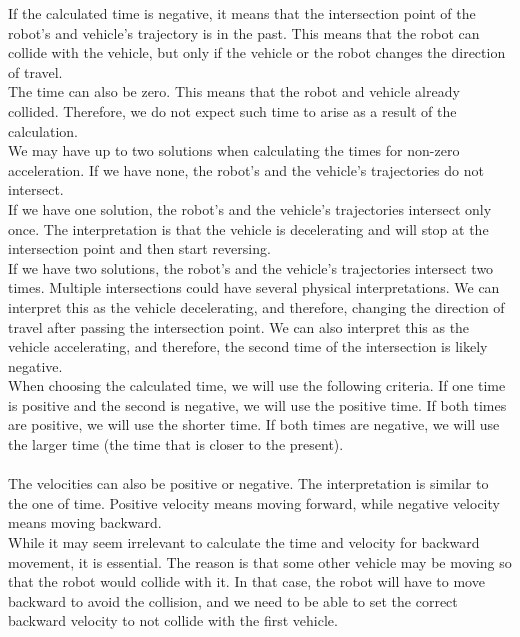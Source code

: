         If the calculated time is negative, it means that the intersection point of the robot's and vehicle's trajectory is in the past. This means that the robot can collide with the vehicle, but only if the vehicle or the robot changes the direction of travel.\\
        The time can also be zero. This means that the robot and vehicle already collided. Therefore, we do not expect such time to arise as a result of the calculation.\\
        We may have up to two solutions when calculating the times for non-zero acceleration. If we have none, the robot's and the vehicle's trajectories do not intersect.\\
        If we have one solution, the robot's and the vehicle's trajectories intersect only once. The interpretation is that the vehicle is decelerating and will stop at the intersection point and then start reversing.\\
        If we have two solutions, the robot's and the vehicle's trajectories intersect two times. Multiple intersections could have several physical interpretations. We can interpret this as the vehicle decelerating, and therefore, changing the direction of travel after passing the intersection point. We can also interpret this as the vehicle accelerating, and therefore, the second time of the intersection is likely negative.\\
        When choosing the calculated time, we will use the following criteria. If one time is positive and the second is negative, we will use the positive time. If both times are positive, we will use the shorter time. If both times are negative, we will use the larger time (the time that is closer to the present).\\\\
        The velocities can also be positive or negative. The interpretation is similar to the one of time. Positive velocity means moving forward, while negative velocity means moving backward.\\
        While it may seem irrelevant to calculate the time and velocity for backward movement, it is essential. The reason is that some other vehicle may be moving so that the robot would collide with it. In that case, the robot will have to move backward to avoid the collision, and we need to be able to set the correct backward velocity to not collide with the first vehicle.\\\\
    \\
